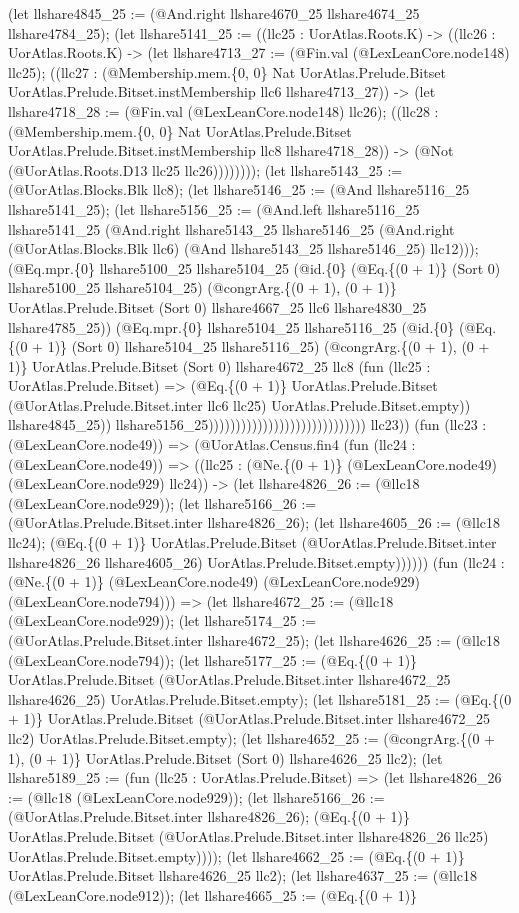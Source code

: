 \documentclass[11pt]{article}
\begin{document}
(let llshare4845\_25 := (@And.right llshare4670\_25 llshare4674\_25 llshare4784\_25); (let llshare5141\_25 := ((llc25 : UorAtlas.Roots.K) -> ((llc26 : UorAtlas.Roots.K) -> (let llshare4713\_27 := (@Fin.val (@LexLeanCore.node148) llc25); ((llc27 : (@Membership.mem.\{0, 0\} Nat UorAtlas.Prelude.Bitset UorAtlas.Prelude.Bitset.instMembership llc6 llshare4713\_27)) -> (let llshare4718\_28 := (@Fin.val (@LexLeanCore.node148) llc26); ((llc28 : (@Membership.mem.\{0, 0\} Nat UorAtlas.Prelude.Bitset UorAtlas.Prelude.Bitset.instMembership llc8 llshare4718\_28)) -> (@Not (@UorAtlas.Roots.D13 llc25 llc26)))))))); (let llshare5143\_25 := (@UorAtlas.Blocks.Blk llc8); (let llshare5146\_25 := (@And llshare5116\_25 llshare5141\_25); (let llshare5156\_25 := (@And.left llshare5116\_25 llshare5141\_25 (@And.right llshare5143\_25 llshare5146\_25 (@And.right (@UorAtlas.Blocks.Blk llc6) (@And llshare5143\_25 llshare5146\_25) llc12))); (@Eq.mpr.\{0\} llshare5100\_25 llshare5104\_25 (@id.\{0\} (@Eq.\{(0 + 1)\} (Sort 0) llshare5100\_25 llshare5104\_25) (@congrArg.\{(0 + 1), (0 + 1)\} UorAtlas.Prelude.Bitset (Sort 0) llshare4667\_25 llc6 llshare4830\_25 llshare4785\_25)) (@Eq.mpr.\{0\} llshare5104\_25 llshare5116\_25 (@id.\{0\} (@Eq.\{(0 + 1)\} (Sort 0) llshare5104\_25 llshare5116\_25) (@congrArg.\{(0 + 1), (0 + 1)\} UorAtlas.Prelude.Bitset (Sort 0) llshare4672\_25 llc8 (fun (llc25 : UorAtlas.Prelude.Bitset) => (@Eq.\{(0 + 1)\} UorAtlas.Prelude.Bitset (@UorAtlas.Prelude.Bitset.inter llc6 llc25) UorAtlas.Prelude.Bitset.empty)) llshare4845\_25)) llshare5156\_25))))))))))))))))))))))))))))) llc23)) (fun (llc23 : (@LexLeanCore.node49)) => (@UorAtlas.Census.fin4 (fun (llc24 : (@LexLeanCore.node49)) => ((llc25 : (@Ne.\{(0 + 1)\} (@LexLeanCore.node49) (@LexLeanCore.node929) llc24)) -> (let llshare4826\_26 := (@llc18 (@LexLeanCore.node929)); (let llshare5166\_26 := (@UorAtlas.Prelude.Bitset.inter llshare4826\_26); (let llshare4605\_26 := (@llc18 llc24); (@Eq.\{(0 + 1)\} UorAtlas.Prelude.Bitset (@UorAtlas.Prelude.Bitset.inter llshare4826\_26 llshare4605\_26) UorAtlas.Prelude.Bitset.empty)))))) (fun (llc24 : (@Ne.\{(0 + 1)\} (@LexLeanCore.node49) (@LexLeanCore.node929) (@LexLeanCore.node794))) => (let llshare4672\_25 := (@llc18 (@LexLeanCore.node929)); (let llshare5174\_25 := (@UorAtlas.Prelude.Bitset.inter llshare4672\_25); (let llshare4626\_25 := (@llc18 (@LexLeanCore.node794)); (let llshare5177\_25 := (@Eq.\{(0 + 1)\} UorAtlas.Prelude.Bitset (@UorAtlas.Prelude.Bitset.inter llshare4672\_25 llshare4626\_25) UorAtlas.Prelude.Bitset.empty); (let llshare5181\_25 := (@Eq.\{(0 + 1)\} UorAtlas.Prelude.Bitset (@UorAtlas.Prelude.Bitset.inter llshare4672\_25 llc2) UorAtlas.Prelude.Bitset.empty); (let llshare4652\_25 := (@congrArg.\{(0 + 1), (0 + 1)\} UorAtlas.Prelude.Bitset (Sort 0) llshare4626\_25 llc2); (let llshare5189\_25 := (fun (llc25 : UorAtlas.Prelude.Bitset) => (let llshare4826\_26 := (@llc18 (@LexLeanCore.node929)); (let llshare5166\_26 := (@UorAtlas.Prelude.Bitset.inter llshare4826\_26); (@Eq.\{(0 + 1)\} UorAtlas.Prelude.Bitset (@UorAtlas.Prelude.Bitset.inter llshare4826\_26 llc25) UorAtlas.Prelude.Bitset.empty)))); (let llshare4662\_25 := (@Eq.\{(0 + 1)\} UorAtlas.Prelude.Bitset llshare4626\_25 llc2); (let llshare4637\_25 := (@llc18 (@LexLeanCore.node912)); (let llshare4665\_25 := (@Eq.\{(0 + 1)\} 
\end{document}

